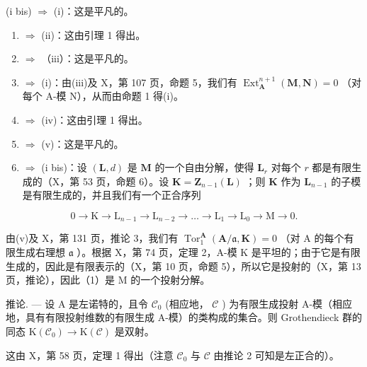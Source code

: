 (i bis) \(\Rightarrow\) (i)：这是平凡的。

\begin{enumerate}
\def\labelenumi{(\roman{enumi})}
\item
  \(\Rightarrow\) (ii)：这由引理 1 得出。
\item
  \(\Rightarrow\) （iii）：这是平凡的。
\item
  \(\Rightarrow\) (i)：由(iii)及 X，第 107 页，命题 5，我们有 \(\operatorname{Ext}_{\mathbf{A}}^{n+1}(\mathbf{M}, \mathbf{N}) = 0\) （对每个 A-模 N），从而由命题 1 得(i)。
\item
  \(\Rightarrow\) (iv)：这由引理 1 得出。
\item
  \(\Rightarrow\) (v)：这是平凡的。
\item
  \(\Rightarrow\) (i bis)：设 \((\mathbf{L}, d)\) 是 \(\mathbf{M}\) 的一个自由分解，使得 \(\mathbf{L}_r\) 对每个 \(r\) 都是有限生成的（X，第 53 页，命题 6）。设 \(\mathbf{K} = \mathbf{Z}_{n-1}(\mathbf{L})\) ；则 \(\mathbf{K}\) 作为 \(\mathbf{L}_{n-1}\) 的子模是有限生成的，并且我们有一个正合序列
\end{enumerate}

\[
0 \rightarrow \mathrm{K} \rightarrow \mathrm{L} _ {n - 1} \rightarrow \mathrm{L} _ {n - 2} \rightarrow \dots \rightarrow \mathrm{L} _ {1} \rightarrow \mathrm{L} _ {0} \rightarrow \mathrm{M} \rightarrow 0.\tag{1}
\]

由(v)及 X，第 131 页，推论 3，我们有 \(\operatorname{Tor}_{1}^{\mathbf{A}}(\mathbf{A}/\mathfrak{a},\mathbf{K}) = 0\) （对 A 的每个有限生成右理想 \(\mathfrak{a}\) ）。根据 X，第 74 页，定理 2，A-模 K 是平坦的；由于它是有限生成的，因此是有限表示的（X，第 10 页，命题 5），所以它是投射的（X，第 13 页，推论），因此（1）是 M 的一个投射分解。

推论. --- 设 A 是左诺特的，且令 \(\mathcal{C}_{0}\) (相应地， \(\mathcal{C}\) ) 为有限生成投射 A-模（相应地，具有有限投射维数的有限生成 A-模）的类构成的集合。则 Grothendieck 群的同态 \(\mathrm{K}(\mathcal{C}_{0}) \to \mathrm{K}(\mathcal{C})\) 是双射。

这由 X，第 58 页，定理 1 得出（注意 \(\mathcal{C}_0\) 与 \(\mathcal{C}\) 由推论 2 可知是左正合的）。

